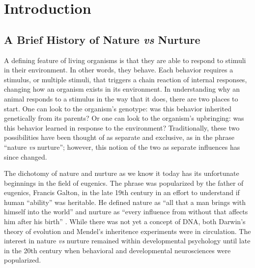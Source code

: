\documentclass[12pt,twoside]{reedthesis}
\begin{document}

\chapter{Introduction}

 \doublespacing
\section{A Brief History of Nature \textit{vs} Nurture}		
A defining feature of living organisms is that they are able to respond to
stimuli in their environment. In other words, they behave. Each behavior
requires a stimulus, or multiple stimuli, that triggers a chain
reaction of internal responses, changing how an organism exists in its
environment. In understanding why an animal responds to a stimulus in the way
that it does, there
are two places to start. One can look to the organism's genotype:
was this behavior inherited genetically from its parents? Or one can look to the
organism's upbringing: was this behavior learned in response to
the environment? Traditionally, these two possibilities have been thought of as
separate and exclusive, as in the phrase ``nature \textit{vs} nurture'';
however, this notion of the two as separate influences has since changed.  

The dichotomy of nature and nurture as we know it today has its unfortunate beginnings in
the field of eugenics. The phrase was popularized by the father of eugenics, Francis
Galton, in the late 19th century in an effort to understand if human ``ability''
was heritable. He defined nature as ``all that a man brings with himself into
the world'' and nurture as ``every influence from without that affects him after
his birth'' \citep{galton_english_1874}. While there was not yet a concept of DNA, both
Darwin's theory of evolution and Mendel's inheritence experiments were in
circulation. The interest in nature \textit{vs} nurture remained within developmental
psychology until late in the 20th century when behavioral and developmental
neurosciences were popularized.
\end{document}

